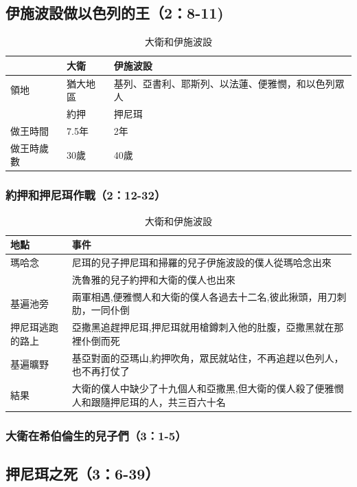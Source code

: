 \subsection{伊施波設做以色列的王（2：8-11)}
\begin{table}[!hbp]
\centering 
\begin{tabular}{|p{2cm}|p{1.5cm}|p{9cm}|}
\hline
\hline
 & 大衛& 伊施波設\\\hline
領地 &猶大地區&基列、亞書利、耶斯列、以法蓮、便雅憫，和以色列眾人\\\hline
&約押&押尼珥\\\hline
做王時間& 7.5年&2年\\\hline
做王時歲數& 30歲 & 40歲\\\hline
\end{tabular}
\caption{大衛和伊施波設}
\end{table}

\subsubsection{約押和押尼珥作戰（2：12-32）}
\begin{table}[!hbp]
\centering 
\begin{tabular}{|p{3.5cm}|p{13cm}|}
\hline
\hline
 地點& 事件\\\hline
瑪哈念&尼珥的兒子押尼珥和掃羅的兒子伊施波設的僕人從瑪哈念出來\\\hline
&洗魯雅的兒子約押和大衛的僕人也出來\\\hline
基遍池旁&兩軍相遇,便雅憫人和大衛的僕人各過去十二名,彼此揪頭，用刀刺肋，一同仆倒\\\hline
押尼珥逃跑的路上& 亞撒黑追趕押尼珥,押尼珥就用槍鐏刺入他的肚腹，亞撒黑就在那裡仆倒而死\\\hline
基遍曠野&基亞對面的亞瑪山,約押吹角，眾民就站住，不再追趕以色列人，也不再打仗了\\\hline\hline
 結果&大衛的僕人中缺少了十九個人和亞撒黑,但大衛的僕人殺了便雅憫人和跟隨押尼珥的人，共三百六十名\\\hline
\end{tabular}
\caption{大衛和伊施波設}
\end{table}


\subsubsection{大衛在希伯倫生的兒子們（3：1-5）}


\subsection{押尼珥之死（3：6-39）}
